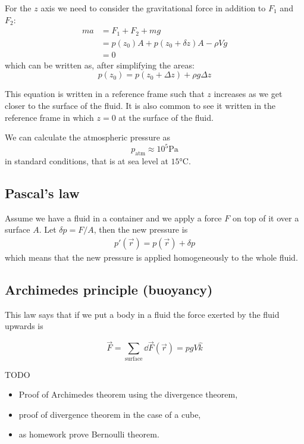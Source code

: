 \documentclass[12pt]{extarticle}
\begin{document}
For the $z$ axis we need to consider the gravitational force in addition to $F_1$ and $F_2$:
\begin{align}
    m a & = F_1 + F_2 + m g                           \\
        & = p(z_0) A + p(z_0 + \delta z) A - \rho V g \\
        & = 0
\end{align}
which can be written as, after simplifying the areas:
\begin{equation}
    p(z_0) = p(z_0 + \Delta z) + \rho g \Delta z
\end{equation}

This equation is written in a reference frame such that $z$ increases as we get closer to the surface of the fluid.
It is also common to see it written in the reference frame in which $z = 0$ at the surface of the fluid.

We can calculate the atmospheric pressure as
\begin{equation}
    p_\text{atm} \approx 10^5 \si{\pascal}
\end{equation}
in standard conditions, that is at sea level at $15 \si{\celsius}$.

\subsection{Pascal's law}

Assume we have a fluid in a container and we apply a force $F$ on top of it over a surface $A$.
Let $\delta p = F/A$, then the new pressure is
\begin{eqnarray}
    p'(\vec r) = p (\vec r) + \delta p
\end{eqnarray}
which means that the new pressure is applied homogeneously to the whole fluid.

\subsection{Archimedes principle (buoyancy)}

This law says that if we put a body in a fluid the force exerted by the fluid upwards is

\begin{equation}
    \vec F = \sum_{\text{surface}} \dd{\vec F}(\vec r) = pgV \hat k
\end{equation}

TODO
\begin{itemize}
    \item
          Proof of Archimedes theorem using the divergence theorem,
    \item
          proof of divergence theorem in the case of a cube,
    \item
          as homework prove Bernoulli theorem.
\end{itemize}
\end{document}
